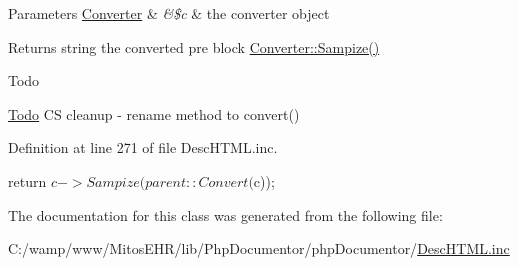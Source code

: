 \begin{DoxyParams}[1]{\-Parameters}
\hyperlink{class_converter}{\-Converter} & {\em \&\$c} & the converter object\\
\hline
\end{DoxyParams}
\begin{DoxyReturn}{\-Returns}
string the converted pre block  \hyperlink{class_converter_a4b343b673401649ba437fd9aea0b302a}{\-Converter\-::\-Sampize()} 
\end{DoxyReturn}
\begin{DoxyRefDesc}{\-Todo}
\item[\hyperlink{todo__todo000037}{\-Todo}]\-C\-S cleanup -\/ rename method to convert() \end{DoxyRefDesc}


\-Definition at line 271 of file \-Desc\-H\-T\-M\-L.\-inc.


\begin{DoxyCode}
    {
        return $c->Sampize(parent::Convert($c));
    }
\end{DoxyCode}


\-The documentation for this class was generated from the following file\-:\begin{DoxyCompactItemize}
\item 
\-C\-:/wamp/www/\-Mitos\-E\-H\-R/lib/\-Php\-Documentor/php\-Documentor/\hyperlink{_desc_h_t_m_l_8inc}{\-Desc\-H\-T\-M\-L.\-inc}\end{DoxyCompactItemize}
